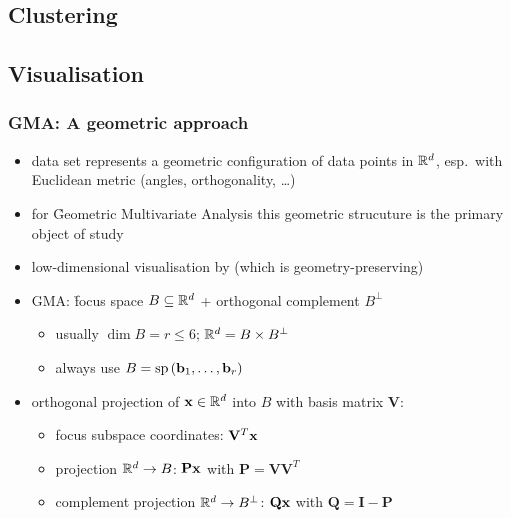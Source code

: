 \documentclass[t]{beamer} %
\begin{document}
\subsection{Clustering}



\subsection{Visualisation}


\begin{frame}
  \frametitle{GMA: A geometric approach}

  \begin{itemize}
  \item data set represents a geometric configuration of data points in $\mathbb{R}^d$, esp.\ with Euclidean metric (\so angles, orthogonality, \ldots)
  \item for \h{Geometric Multivariate Analysis} \citep[: ][]{Diwersy:Evert:Neumann:14,Evert:Neumann:16} this geometric strucuture is the primary object of study
  \item[\So] low-dimensional visualisation by  (which is geometry-preserving)
  \item GMA: \h{focus space} $B\subseteq \mathbb{R}^d$ + orthogonal complement $B^{\perp}$
    \begin{itemize}
    \item usually $\dim B = r \leq 6$; $\mathbb{R}^d = B \times B^{\perp}$
    \item always use  $B = \Span{\vb_1, \ldots, \vb_r}$
    \end{itemize}
  \item orthogonal projection of $\vx\in \setR^d$ into $B$ with basis matrix $\mathbf{V}$:
    \begin{itemize}
    \item focus subspace coordinates: $\mathbf{V}^T \vx$
    \item projection $\mathbb{R}^d \to B$: $\mathbf{P} \vx$ with $\mathbf{P} = \mathbf{V} \mathbf{V}^T$
    \item complement projection $\mathbb{R}^d \to B^{\perp}$: $\mathbf{Q} \vx$ with $\mathbf{Q} = \mathbf{I} - \mathbf{P}$
    \end{itemize}
  \end{itemize}
\end{frame}
\end{document}
